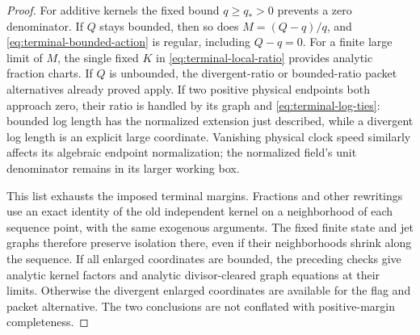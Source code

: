 \begin{proof}
For additive kernels the fixed bound \(q\ge q_*>0\) prevents a zero
denominator.  If \(Q\) stays bounded, then so does
\(M=(Q-q)/q\), and \eqref{eq:terminal-bounded-action} is regular,
including \(Q-q=0\).  For a finite large limit of \(M\), the single
fixed \(K\) in \eqref{eq:terminal-local-ratio} provides analytic
fraction charts.  If \(Q\) is unbounded, the divergent-ratio or
bounded-ratio packet alternatives already proved apply.  If two positive
physical endpoints both approach zero, their ratio is handled by its
graph and \eqref{eq:terminal-log-ties}: bounded log length has the
normalized extension just described, while a divergent log length is an
explicit large coordinate.  Vanishing physical clock speed similarly
affects its algebraic endpoint normalization; the normalized field's unit
denominator remains in its larger working box.

This list exhausts the imposed terminal margins.  Fractions and other
rewritings use an exact identity of the old independent kernel on a
neighborhood of each sequence point, with the same exogenous arguments.
The fixed finite state and jet graphs therefore preserve isolation there,
even if their neighborhoods shrink along the sequence.  If all enlarged
coordinates are bounded, the preceding checks give analytic kernel
factors and analytic divisor-cleared graph equations at their limits.
Otherwise the divergent enlarged coordinates are available for the flag
and packet alternative.  The two conclusions are not conflated with
positive-margin completeness.
\end{proof}

